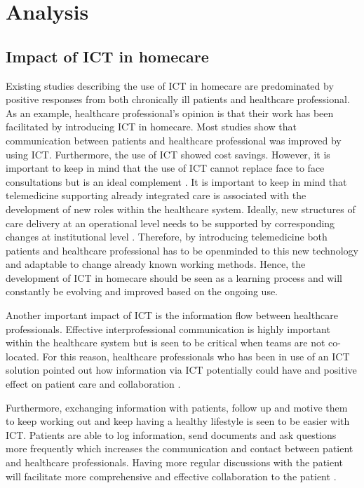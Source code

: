 \chapter{Analysis}

\label{analysis}

\section{Impact of ICT in homecare}
Existing studies describing the use of ICT in homecare are predominated by positive responses from both chronically ill patients and healthcare professional. As an example, healthcare professional’s opinion is that their work has been facilitated by introducing ICT in homecare. Most studies show that communication between patients and healthcare professional was improved by using ICT. Furthermore, the use of ICT showed cost savings. However, it is important to keep in mind that the use of ICT cannot replace face to face consultations but is an ideal complement \cite{ICT}. It is important to keep in mind that telemedicine supporting already integrated care is associated with the development of new roles within the healthcare system. Ideally, new structures of care delivery at an operational level needs to be supported by corresponding changes at institutional level \cite{countries}. Therefore, by introducing telemedicine both patients and healthcare professional has to be openminded to this new technology and adaptable to change already known working methods. Hence, the development of ICT in homecare should be seen as a learning process and will constantly be evolving and improved based on the ongoing use. 

Another important impact of ICT is the information flow between healthcare professionals. Effective interprofessional communication is highly important within the healthcare system but is seen to be critical when teams are not co-located. For this reason, healthcare professionals who has been in use of an ICT solution pointed out how information via ICT potentially could have and positive effect on patient care and collaboration \cite{barrier}.

Furthermore, exchanging information with patients, follow up and motive them to keep working out and keep having a healthy lifestyle is seen to be easier with ICT. Patients are able to log information, send documents and ask questions more frequently which increases the communication and contact between patient and healthcare professionals. Having more regular discussions with the patient will facilitate more comprehensive and effective collaboration to the patient \cite{barrier}.

